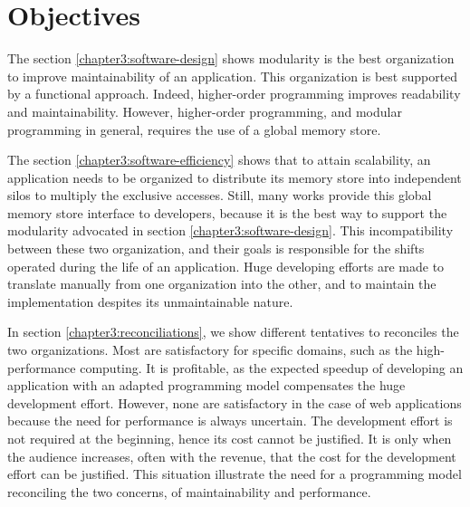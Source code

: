 \section{Objectives} \label{chapter3:objectives}


The section \ref{chapter3:software-design} shows modularity is the best organization to improve maintainability of an application.
This organization is best supported by a functional approach.
Indeed, higher-order programming improves readability and maintainability.
However, higher-order programming, and modular programming in general, requires the use of a global memory store.

The section \ref{chapter3:software-efficiency} shows that to attain scalability, an application needs to be organized to distribute its memory store into independent silos to multiply the exclusive accesses.
Still, many works provide this global memory store interface to developers, because it is the best way to support the modularity advocated in section \ref{chapter3:software-design}.
This incompatibility between these two organization, and their goals is responsible for the shifts operated during the life of an application.
Huge developing efforts are made to translate manually from one organization into the other, and to maintain the implementation despites its unmaintainable nature.

In section \ref{chapter3:reconciliations}, we show different tentatives to reconciles the two organizations.
Most are satisfactory for specific domains, such as the high-performance computing.
It is profitable, as the expected speedup of developing an application with an adapted programming model compensates the huge development effort.
However, none are satisfactory in the case of web applications because the need for performance is always uncertain.
The development effort is not required at the beginning, hence its cost cannot be justified.
It is only when the audience increases, often with the revenue, that the cost for the development effort can be justified.
This situation illustrate the need for a programming model reconciling the two concerns, of maintainability and performance.

